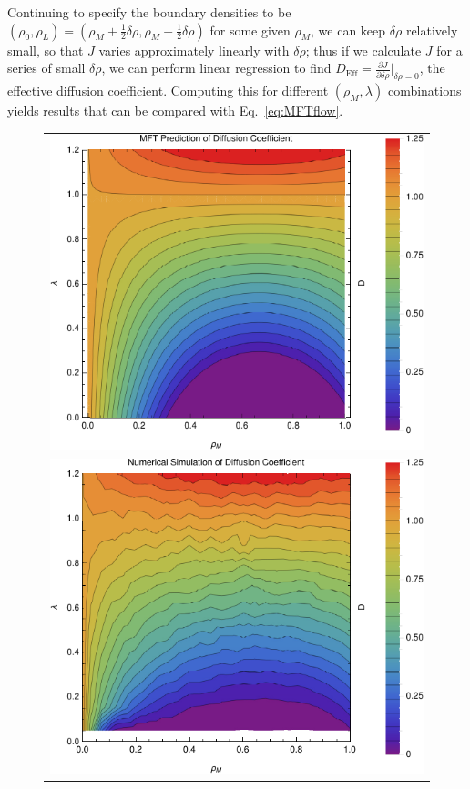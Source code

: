 \documentclass[
reprint, amsmath,amssymb,
]{revtex4-1}
\newcommand{\partDeriv}[2]{\frac{\partial #1}{\partial #2}}
\begin{document}
Continuing to specify the boundary densities to be $(\rho_0, \rho_L) = (\rho_M + \frac{1}{2} \delta\rho, \rho_M - \frac{1}{2} \delta\rho)$ for some given $\rho_M$, we can keep $\delta\rho$ relatively small, so that $J$ varies approximately
linearly with $\delta\rho$; thus if we calculate $J$ for a series of small $\delta \rho$, we can perform linear regression to find $D_\mathrm{Eff}=\partDeriv{J}{\delta\rho}\big|_{\delta\rho=0}$, the effective diffusion coefficient.
Computing this for different $(\rho_M, \lambda)$ combinations yields results that can be compared with Eq.~\ref{eq:MFTflow}.
\begin{figure}[h!]
\vspace{1em}
\begin{center}
 \begin{tabular}{c}
    \includegraphics[width=1\linewidth]{newAnalFlow} \\
    \includegraphics[width=1\linewidth]{newDataFlow}

\end{tabular}
\end{center}
\end{figure}
\end{document}
